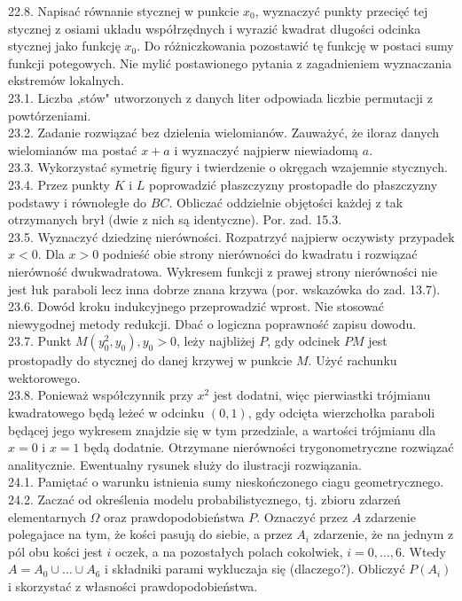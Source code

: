\documentclass[10pt]{article}
\begin{document}
22.8. Napisać równanie stycznej w punkcie $x_{0}$, wyznaczyć punkty przecięć tej stycznej z osiami układu współrzędnych i wyrazić kwadrat długości odcinka stycznej jako funkcję $x_{0}$. Do różniczkowania pozostawić tę funkcję w postaci sumy funkcji potegowych. Nie mylić postawionego pytania z zagadnieniem wyznaczania ekstremów lokalnych.\\
23.1. Liczba ,stów" utworzonych z danych liter odpowiada liczbie permutacji z powtórzeniami.\\
23.2. Zadanie rozwiązać bez dzielenia wielomianów. Zauważyć, że iloraz danych wielomianów ma postać $x+a$ i wyznaczyć najpierw niewiadomą $a$.\\
23.3. Wykorzystać symetrię figury i twierdzenie o okręgach wzajemnie stycznych.\\
23.4. Przez punkty $K$ i $L$ poprowadzić płaszczyzny prostopadłe do płaszczyzny podstawy i równoległe do $B C$. Obliczać oddzielnie objętości każdej z tak otrzymanych brył (dwie z nich są identyczne). Por. zad. 15.3.\\
23.5. Wyznaczyć dziedzinę nierówności. Rozpatrzyć najpierw oczywisty przypadek $x<0$. Dla $x>0$ podnieść obie strony nierówności do kwadratu i rozwiązać nierówność dwukwadratowa. Wykresem funkcji z prawej strony nierówności nie jest łuk paraboli lecz inna dobrze znana krzywa (por. wskazówka do zad. 13.7).\\
23.6. Dowód kroku indukcyjnego przeprowadzić wprost. Nie stosować niewygodnej metody redukcji. Dbać o logiczna poprawność zapisu dowodu.\\
23.7. Punkt $M\left(y_{0}^{2}, y_{0}\right), y_{0}>0$, leży najbliżej $P$, gdy odcinek $P M$ jest prostopadły do stycznej do danej krzywej w punkcie $M$. Użyć rachunku wektorowego.\\
23.8. Ponieważ współczynnik przy $x^{2}$ jest dodatni, więc pierwiastki trójmianu kwadratowego będą leżeć w odcinku $(0,1)$, gdy odcięta wierzchołka paraboli będącej jego wykresem znajdzie się w tym przedziale, a wartości trójmianu dla $x=0$ i $x=1$ będą dodatnie. Otrzymane nierówności trygonometryczne rozwiązać analitycznie. Ewentualny rysunek służy do ilustracji rozwiązania.\\
24.1. Pamiętać o warunku istnienia sumy nieskończonego ciagu geometrycznego.\\
24.2. Zaczać od określenia modelu probabilistycznego, tj. zbioru zdarzeń elementarnych $\Omega$ oraz prawdopodobieństwa $P$. Oznaczyć przez $A$ zdarzenie polegajace na tym, że kości pasują do siebie, a przez $A_{i}$ zdarzenie, że na jednym z pól obu kości jest $i$ oczek, a na pozostałych polach cokolwiek, $i=0, \ldots, 6$. Wtedy $A=A_{0} \cup \ldots \cup A_{6}$ i składniki parami wykluczaja się (dlaczego?). Obliczyć $P\left(A_{i}\right)$ i skorzystać z własności prawdopodobieństwa.\\
\end{document}
